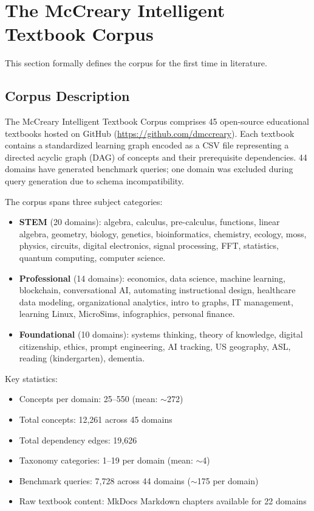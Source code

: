 \section{The McCreary Intelligent Textbook Corpus}\label{sec:corpus}

This section formally defines the corpus for the first time in literature.

\subsection{Corpus Description}\label{sec:corpus-desc}

The McCreary Intelligent Textbook Corpus comprises 45 open-source educational
textbooks hosted on GitHub (\url{https://github.com/dmccreary}). Each textbook
contains a standardized learning graph encoded as a CSV file representing a
directed acyclic graph (DAG) of concepts and their prerequisite dependencies.
44 domains have generated benchmark queries; one domain was excluded during
query generation due to schema incompatibility.

The corpus spans three subject categories:
\begin{itemize}
  \item \textbf{STEM} (20 domains): algebra, calculus, pre-calculus, functions,
    linear algebra, geometry, biology, genetics, bioinformatics, chemistry,
    ecology, moss, physics, circuits, digital electronics, signal processing,
    FFT, statistics, quantum computing, computer science.
  \item \textbf{Professional} (14 domains): economics, data science, machine
    learning, blockchain, conversational AI, automating instructional design,
    healthcare data modeling, organizational analytics, intro to graphs,
    IT management, learning Linux, MicroSims, infographics, personal finance.
  \item \textbf{Foundational} (10 domains): systems thinking, theory of knowledge,
    digital citizenship, ethics, prompt engineering, AI tracking, US geography,
    ASL, reading (kindergarten), dementia.
\end{itemize}

Key statistics:
\begin{itemize}
  \item Concepts per domain: 25--550 (mean: $\sim$272)
  \item Total concepts: 12,261 across 45 domains
  \item Total dependency edges: 19,626
  \item Taxonomy categories: 1--19 per domain (mean: $\sim$4)
  \item Benchmark queries: 7,728 across 44 domains ($\sim$175 per domain)
  \item Raw textbook content: MkDocs Markdown chapters available for 22 domains
\end{itemize}

